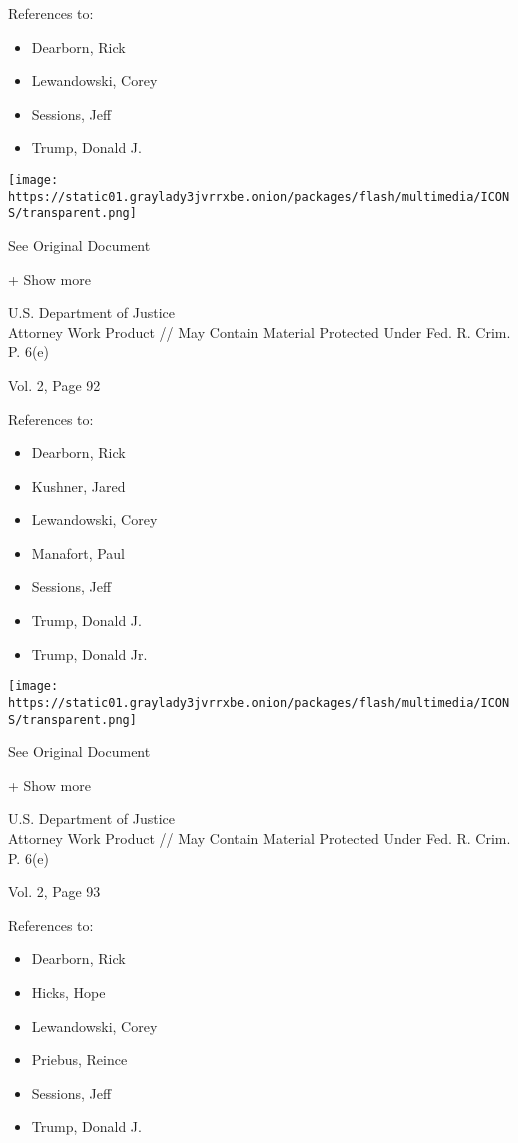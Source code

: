 References to:

\begin{itemize}
\tightlist
\item
  Dearborn, Rick
\item
  Lewandowski, Corey
\item
  Sessions, Jeff
\item
  Trump, Donald J.
\end{itemize}

\protect\hyperlink{}{}

\texttt{[image: https://static01.graylady3jvrrxbe.onion/packages/flash/multimedia/ICONS/transparent.png]}

See Original Document

+ Show more

U.S. Department of Justice\\
Attorney Work Product // May Contain Material Protected Under Fed. R.
Crim. P. 6(e)

Vol. 2, Page 92

References to:

\begin{itemize}
\tightlist
\item
  Dearborn, Rick
\item
  Kushner, Jared
\item
  Lewandowski, Corey
\item
  Manafort, Paul 
\item
  Sessions, Jeff
\item
  Trump, Donald J.
\item
  Trump, Donald Jr.
\end{itemize}

\protect\hyperlink{}{}

\texttt{[image: https://static01.graylady3jvrrxbe.onion/packages/flash/multimedia/ICONS/transparent.png]}

See Original Document

+ Show more

U.S. Department of Justice\\
Attorney Work Product // May Contain Material Protected Under Fed. R.
Crim. P. 6(e)

Vol. 2, Page 93

References to:

\begin{itemize}
\tightlist
\item
  Dearborn, Rick
\item
  Hicks, Hope
\item
  Lewandowski, Corey
\item
  Priebus, Reince
\item
  Sessions, Jeff
\item
  Trump, Donald J.
\end{itemize}

